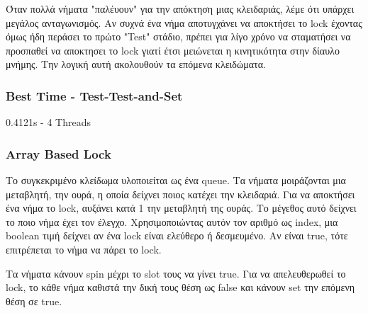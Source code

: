 \documentclass[../final_report.tex]{subfiles}
\begin{document}
Όταν πολλά νήματα "παλέυουν" για την απόκτηση μιας κλειδαριάς, λέμε ότι υπάρχει μεγάλος ανταγωνισμός.
Αν συχνά ένα νήμα αποτυγχάνει να αποκτήσει το lock έχοντας όμως ήδη περάσει το πρώτο "Test" στάδιο,
πρέπει για λίγο χρόνο να σταματήσει να προσπαθεί να αποκτησει το lock γιατί έτσι μειώνεται η 
κινητικότητα στην δίαυλο μνήμης. Την λογική αυτή ακολουθούν τα επόμενα κλειδώματα.

\subsubsection*{Best Time - Test-Test-and-Set}
0.4121s - 4 Threads

\subsubsection{Array Based Lock}

Το συγκεκριμένο κλείδωμα υλοποιείται ως ένα queue. Τα νήματα μοιράζονται μια μεταβλητή, την ουρά,
η οποία δείχνει ποιος κατέχει την κλειδαριά. Για να αποκτήσει ένα νήμα το lock, αυξάνει κατά 1 την 
μεταβλητή της ουράς. Το μέγεθος αυτό δείχνει το ποιο νήμα έχει τον έλεγχο. Χρησιμοποιώντας αυτόν τον
αριθμό ως index, μια boolean τιμή δείχνει αν ένα lock είναι ελεύθερο ή δεσμευμένο. Αν είναι true, τότε επιτρέπεται
το νήμα να πάρει το lock.

Τα νήματα κάνουν spin μέχρι το slot τους να γίνει true. Για να απελευθερωθεί το lock, το κάθε νήμα
καθιστά την δική τους θέση ως false και κάνουν set την επόμενη θέση σε true.
\end{document}

